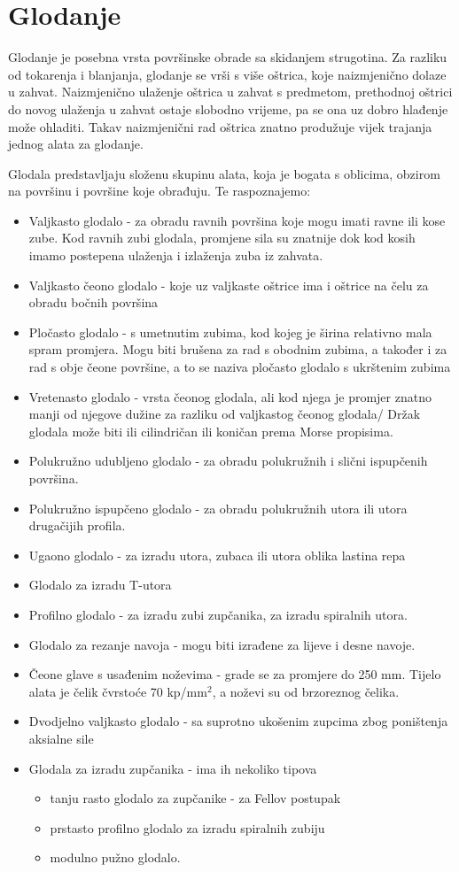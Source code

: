 \documentclass[a4paper,12pt]{article}
\numberwithin{figure}{section}
\begin{document}
\section{Glodanje}
Glodanje je posebna vrsta površinske obrade sa skidanjem strugotina. Za razliku od tokarenja i blanjanja, glodanje se vrši s više oštrica, koje naizmjenično dolaze u zahvat. Naizmjenično ulaženje oštrica u zahvat s predmetom, prethodnoj oštrici do novog ulaženja u zahvat ostaje slobodno vrijeme, pa se ona uz dobro hlađenje može ohladiti. Takav naizmjenični rad oštrica znatno produžuje vijek trajanja jednog alata za glodanje.\par
Glodala predstavljaju složenu skupinu alata, koja je bogata s oblicima, obzirom na površinu i površine koje obrađuju. Te raspoznajemo:
\begin{itemize}
\item Valjkasto glodalo - za obradu ravnih površina koje mogu imati ravne ili kose zube. Kod ravnih zubi glodala, promjene sila su znatnije dok kod kosih imamo postepena ulaženja i izlaženja zuba iz zahvata.
\item Valjkasto čeono glodalo - koje uz valjkaste oštrice ima i oštrice na čelu za obradu bočnih površina
\item Pločasto glodalo - s umetnutim zubima, kod kojeg je širina relativno mala spram promjera. Mogu biti brušena za rad s obodnim zubima, a također i za rad s obje čeone površine, a to se naziva pločasto glodalo s ukrštenim zubima
\item Vretenasto glodalo - vrsta čeonog glodala, ali kod njega je promjer znatno manji od njegove dužine za razliku od valjkastog čeonog glodala/ Držak glodala može biti ili cilindričan ili koničan prema Morse propisima.
\item Polukružno udubljeno glodalo - za obradu polukružnih i slični ispupčenih površina.
\item Polukružno ispupčeno glodalo - za obradu polukružnih utora ili utora drugačijih profila.
\item Ugaono glodalo - za izradu utora, zubaca ili utora oblika lastina repa
\item Glodalo za izradu T-utora
\item Profilno glodalo - za izradu zubi zupčanika, za izradu spiralnih utora.
\item Glodalo za rezanje navoja - mogu biti izrađene za lijeve i desne navoje.
\item Čeone glave s usađenim noževima - grade se za promjere do 250 mm. Tijelo alata je čelik čvrstoće 70 kp/mm$^{2}$, a noževi su od brzoreznog čelika.
\item Dvodjelno valjkasto glodalo - sa suprotno ukošenim zupcima zbog poništenja aksialne sile
\item  Glodala za izradu zupčanika - ima ih nekoliko tipova 
\begin{itemize}
\item tanju rasto glodalo za zupčanike - za Fellov postupak
\item prstasto profilno glodalo za izradu spiralnih zubiju
\item modulno pužno glodalo.
\end{itemize}
\end{itemize}
\end{document}
